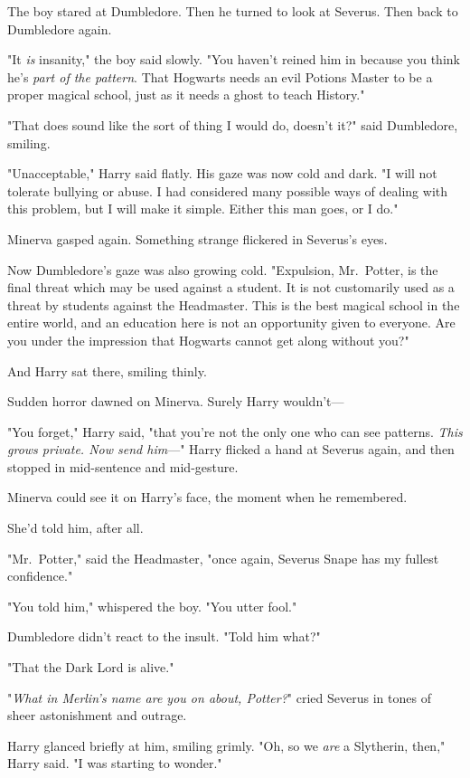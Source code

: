The boy stared at Dumbledore. Then he turned to look at Severus. Then back to 
Dumbledore again.

"It \emph{is} insanity," the boy said slowly. "You haven't reined him in 
because you think he's \emph{part of the pattern}. That Hogwarts needs an evil 
Potions Master to be a proper magical school, just as it needs a ghost to teach 
History."

"That does sound like the sort of thing I would do, doesn't it?" said 
Dumbledore, smiling.

"Unacceptable," Harry said flatly. His gaze was now cold and dark. "I will not 
tolerate bullying or abuse. I had considered many possible ways of dealing with 
this problem, but I will make it simple. Either this man goes, or I do."

Minerva gasped again. Something strange flickered in Severus's eyes.

Now Dumbledore's gaze was also growing cold. "Expulsion, Mr.~Potter, is the 
final threat which may be used against a student. It is not customarily used as 
a threat by students against the Headmaster. This is the best magical school in 
the entire world, and an education here is not an opportunity given to 
everyone. Are you under the impression that Hogwarts cannot get along without 
you?"

And Harry sat there, smiling thinly.

Sudden horror dawned on Minerva. Surely Harry wouldn't---

"You forget," Harry said, "that you're not the only one who can see patterns. 
\emph{This grows private. Now send him}---" Harry flicked a hand at Severus 
again, and then stopped in mid-sentence and mid-gesture.

Minerva could see it on Harry's face, the moment when he remembered.

She'd told him, after all.

"Mr.~Potter," said the Headmaster, "once again, Severus Snape has my fullest 
confidence."

"You told him," whispered the boy. "You utter fool."

Dumbledore didn't react to the insult. "Told him what?"

"That the Dark Lord is alive."

"\emph{What in Merlin's name are you on about, Potter?}" cried Severus in tones 
of sheer astonishment and outrage.

Harry glanced briefly at him, smiling grimly. "Oh, so we \emph{are} a 
Slytherin, then," Harry said. "I was starting to wonder."

